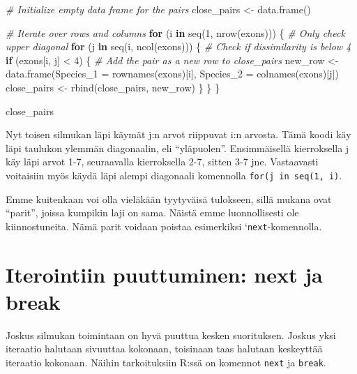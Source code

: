 \documentclass[
]{book}
\newenvironment{Shaded}{\begin{snugshade}}{\end{snugshade}}
\newcommand{\AttributeTok}[1]{\textcolor[rgb]{0.77,0.63,0.00}{#1}}
\newcommand{\CommentTok}[1]{\textcolor[rgb]{0.56,0.35,0.01}{\textit{#1}}}
\newcommand{\ControlFlowTok}[1]{\textcolor[rgb]{0.13,0.29,0.53}{\textbf{#1}}}
\newcommand{\DecValTok}[1]{\textcolor[rgb]{0.00,0.00,0.81}{#1}}
\newcommand{\FunctionTok}[1]{\textcolor[rgb]{0.00,0.00,0.00}{#1}}
\newcommand{\NormalTok}[1]{#1}
\newcommand{\OtherTok}[1]{\textcolor[rgb]{0.56,0.35,0.01}{#1}}
\newcommand{\SpecialCharTok}[1]{\textcolor[rgb]{0.00,0.00,0.00}{#1}}
\begin{document}
\begin{Shaded}
\begin{Highlighting}[]
\CommentTok{\# Initialize empty data frame for the pairs}
\NormalTok{close\_pairs }\OtherTok{\textless{}{-}} \FunctionTok{data.frame}\NormalTok{()}

\CommentTok{\# Iterate over rows and columns}
\ControlFlowTok{for}\NormalTok{ (i }\ControlFlowTok{in} \FunctionTok{seq}\NormalTok{(}\DecValTok{1}\NormalTok{, }\FunctionTok{nrow}\NormalTok{(exons))) \{}
  \CommentTok{\# Only check upper diagonal}
  \ControlFlowTok{for}\NormalTok{ (j }\ControlFlowTok{in} \FunctionTok{seq}\NormalTok{(i, }\FunctionTok{ncol}\NormalTok{(exons))) \{}
    \CommentTok{\# Check if dissimilarity is below 4}
    \ControlFlowTok{if}\NormalTok{ (exons[i, j] }\SpecialCharTok{\textless{}} \DecValTok{4}\NormalTok{) \{}
      \CommentTok{\# Add the pair as a new row to close\_pairs}
\NormalTok{      new\_row }\OtherTok{\textless{}{-}} \FunctionTok{data.frame}\NormalTok{(}\AttributeTok{Species\_1 =} \FunctionTok{rownames}\NormalTok{(exons)[i],}
                            \AttributeTok{Species\_2 =} \FunctionTok{colnames}\NormalTok{(exons)[j])}
\NormalTok{      close\_pairs }\OtherTok{\textless{}{-}} \FunctionTok{rbind}\NormalTok{(close\_pairs,}
\NormalTok{                           new\_row)}
\NormalTok{    \}}
\NormalTok{  \}}
\NormalTok{\}}

\NormalTok{close\_pairs}
\end{Highlighting}
\end{Shaded}

Nyt toisen silmukan läpi käymät j:n arvot riippuvat i:n arvosta. Tämä koodi käy läpi taulukon ylemmän diagonaalin, eli ``yläpuolen''. Ensimmäisellä kierroksella j käy läpi arvot 1-7, seuraavalla kierroksella 2-7, sitten 3-7 jne. Vastaavasti voitaisiin myös käydä läpi alempi diagonaali komennolla \texttt{for(j\ in\ seq(1,\ i)}.

Emme kuitenkaan voi olla vieläkään tyytyväisä tulokseen, sillä mukana ovat ``parit'', joissa kumpikin laji on sama. Näistä emme luonnollisesti ole kiinnostuneita. Nämä parit voidaan poistaa esimerkiksi `\texttt{next}-komennolla.

\hypertarget{iterointiin-puuttuminen-next-ja-break}{%
\section{Iterointiin puuttuminen: next ja break}\label{iterointiin-puuttuminen-next-ja-break}}

Joskus silmukan toimintaan on hyvä puuttua kesken suorituksen. Joskus yksi iteraatio halutaan sivuuttaa kokonaan, toisinaan taas halutaan keskeyttää iteraatio kokonaan. Näihin tarkoituksiin R:ssä on komennot \texttt{next} ja \texttt{break}.
\end{document}
